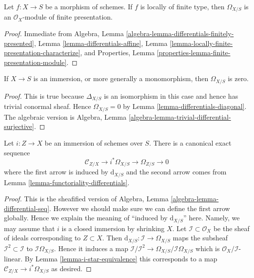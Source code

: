 \begin{lemma}
\label{lemma-finite-presentation-differentials}
Let $f : X \to S$ be a morphism of schemes.
If $f$ is locally of finite type, then $\Omega_{X/S}$ is
an $\mathcal{O}_X$-module of finite presentation.
\end{lemma}

\begin{proof}
Immediate from
Algebra, Lemma \ref{algebra-lemma-differentials-finitely-presented},
Lemma \ref{lemma-differentials-affine},
Lemma \ref{lemma-locally-finite-presentation-characterize}, and
Properties, Lemma \ref{properties-lemma-finite-presentation-module}.
\end{proof}

\begin{lemma}
\label{lemma-immersion-differentials}
If $X \to S$ is an immersion, or more generally a monomorphism, then
$\Omega_{X/S}$ is zero.
\end{lemma}

\begin{proof}
This is true because $\Delta_{X/S}$ is an isomorphism in this case
and hence has trivial conormal sheaf. Hence $\Omega_{X/S} = 0$
by Lemma \ref{lemma-differentials-diagonal}. The algebraic version is
Algebra, Lemma \ref{algebra-lemma-trivial-differential-surjective}.
\end{proof}

\begin{lemma}
\label{lemma-differentials-relative-immersion}
Let $i : Z \to X$ be an immersion of schemes over $S$.
There is a canonical exact sequence
$$
\mathcal{C}_{Z/X} \to i^*\Omega_{X/S} \to \Omega_{Z/S} \to 0
$$
where the first arrow is induced by $\text{d}_{X/S}$
and the second arrow comes from Lemma \ref{lemma-functoriality-differentials}.
\end{lemma}

\begin{proof}
This is the sheafified version of
Algebra, Lemma \ref{algebra-lemma-differential-seq}. However
we should make sure we can define the first arrow globally.
Hence we explain the meaning of ``induced by $\text{d}_{X/S}$'' here.
Namely, we may assume that $i$ is a closed immersion by
shrinking $X$. Let $\mathcal{I} \subset \mathcal{O}_X$
be the sheaf of ideals corresponding to $Z \subset X$.
Then $\text{d}_{X/S} : \mathcal{I} \to \Omega_{X/S}$
maps the subsheaf $\mathcal{I}^2 \subset \mathcal{I}$ to
$\mathcal{I}\Omega_{X/S}$. Hence it induces a map
$\mathcal{I}/\mathcal{I}^2 \to \Omega_{X/S}/\mathcal{I}\Omega_{X/S}$
which is $\mathcal{O}_X/\mathcal{I}$-linear.
By Lemma \ref{lemma-i-star-equivalence} this corresponds to a map
$\mathcal{C}_{Z/X} \to i^*\Omega_{X/S}$ as desired.
\end{proof}

